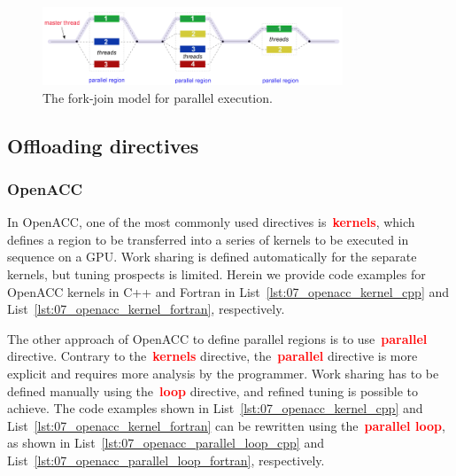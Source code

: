 \begin{figure}[!htbp]
\centering\includegraphics[width=0.8\textwidth]{fig_hardware/fork_join_model.png}
\caption{The fork-join model for parallel execution.}\label{fig:fork_join}
\end{figure}




\subsection{Offloading directives}


\subsubsection{OpenACC}


\par
In OpenACC, one of the most commonly used directives is~\textbf{\textcolor{red}{kernels}}, which defines a region to be transferred into a series of kernels to be executed in sequence on a GPU.
Work sharing is defined automatically for the separate kernels, but tuning prospects is limited.
Herein we provide code examples for OpenACC kernels in C++ and Fortran in List~\ref{lst:07_openacc_kernel_cpp} and List~\ref{lst:07_openacc_kernel_fortran}, respectively.








\par
The other approach of OpenACC to define parallel regions is to use~\textbf{\textcolor{red}{parallel}} directive.
Contrary to the~\textbf{\textcolor{red}{kernels}} directive, the~\textbf{\textcolor{red}{parallel}} directive is more explicit and requires more analysis by the programmer.
Work sharing has to be defined manually using the~\textbf{\textcolor{red}{loop}} directive, and refined tuning is possible to achieve.
The code examples shown in List~\ref{lst:07_openacc_kernel_cpp} and List~\ref{lst:07_openacc_kernel_fortran} can be rewritten using the~\textbf{\textcolor{red}{parallel loop}}, as shown in List~\ref{lst:07_openacc_parallel_loop_cpp} and List~\ref{lst:07_openacc_parallel_loop_fortran}, respectively.


